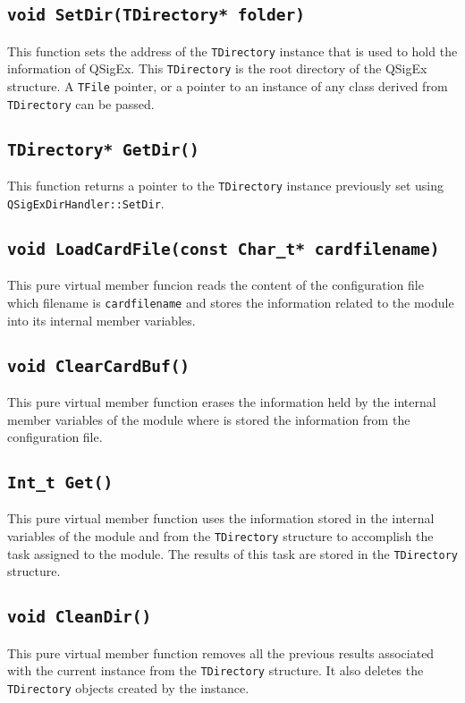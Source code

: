 \subsection{\texttt{void SetDir(TDirectory* folder)}}
This function sets the address of the \texttt{TDirectory} instance that is used to hold the information of QSigEx.
This \texttt{TDirectory} is the root directory of the QSigEx structure.
A \texttt{TFile} pointer, or a pointer to an instance of any class derived from \texttt{TDirectory} can be passed.

\subsection{\texttt{TDirectory* GetDir()}}
This function returns a pointer to the \texttt{TDirectory} instance previously set using \texttt{QSigExDirHandler::SetDir}.

\subsection{\texttt{void LoadCardFile(const Char{\_}t* cardfilename)}}
This pure virtual member funcion reads the content of the configuration file which filename is \texttt{cardfilename} and stores the information related to the module into its internal member variables. 

\subsection{\texttt{void ClearCardBuf()}}
This pure virtual member function erases the information held by the internal member variables of the module where is stored the information from the configuration file.

\subsection{\texttt{Int{\_}t Get()}}
This pure virtual member function uses the information stored in the internal variables of the module and from the \texttt{TDirectory} structure to accomplish the task assigned to the module.
The results of this task are stored in the \texttt{TDirectory} structure. 

\subsection{\texttt{void CleanDir()}}
This pure virtual member function removes all the previous results associated with the current instance from the \texttt{TDirectory} structure.
It also deletes the \texttt{TDirectory} objects created by the instance.

